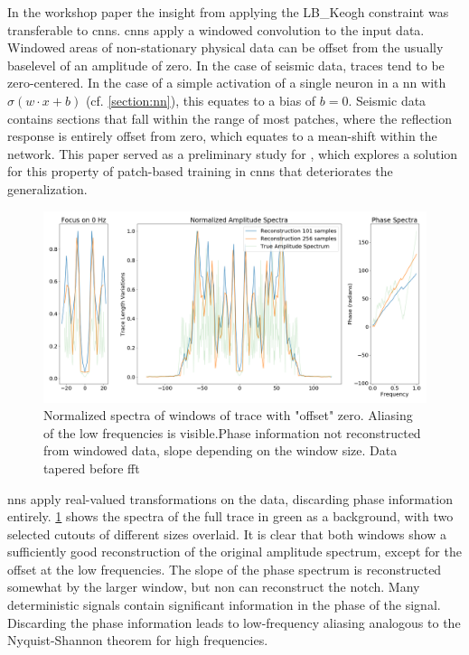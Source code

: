 In the workshop paper  \citep{dramsch2018information} the insight from applying the LB\_Keogh constraint was transferable to \acp{cnn}. \acp{cnn} apply a windowed convolution to the input data. Windowed areas of non-stationary physical data can be offset from the usually baselevel of an amplitude of zero. In the case of seismic data, traces tend to be zero-centered. In the case of a simple activation of a single neuron in a \ac{nn} with $\sigma(w\cdot x + b)$ (cf. \cref{section:nn}), this equates to a bias of $b=0$. Seismic data contains sections that fall within the range of most patches, where the reflection response is entirely offset from zero, which equates to a mean-shift within the network. This paper served as a preliminary study for \citet{dramsch2019complex}, which explores a solution for this property of patch-based training in \acp{cnn} that deteriorates the generalization.

\begin{figure}
    \centering
    \includegraphics[width=\textwidth]{figures/information-windowing.png}
    \caption{Normalized spectra of windows of trace with "offset" zero. Aliasing of the low frequencies is visible.Phase information not reconstructed from windowed data, slope depending on the window size. Data tapered before \ac{fft} \citep[from][]{dramsch2018information}}
    \label{fig:seismic-window}
\end{figure}

\aclp{nn} apply real-valued transformations on the data, discarding phase information entirely. \cref{fig:seismic-window} shows the spectra of the full trace in green as a background, with two selected cutouts of different sizes overlaid. It is clear that both windows show a sufficiently good reconstruction of the original amplitude spectrum, except for the offset at the low frequencies. The slope of the phase spectrum is reconstructed somewhat by the larger window, but non can reconstruct the notch. Many deterministic signals contain significant information in the phase of the signal. Discarding the phase information leads to low-frequency aliasing analogous to the Nyquist-Shannon theorem for high frequencies.

